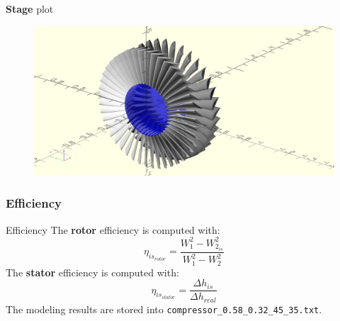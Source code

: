 	\begin{frame}{\textbf{Stage} plot}
		\begin{figure}
			\centering
			\includegraphics[width=1\textwidth]{figures/compressor.png}
		\end{figure}
	\end{frame}

\subsubsection{Efficiency}
	\begin{frame}[fragile]{Efficiency}
		The \textbf{rotor} efficiency is computed with:
		\begin{equation}
			\eta_{is_{rotor}} = \frac{W_1^2 - W_{2_{is}}^2}{W_1^2 - W_{2}^2} \nonumber 
		\end{equation}
		The \textbf{stator} efficiency is computed with:
		\begin{equation}
			\eta_{is_{stator}} = \frac{\Delta h_{is}}{\Delta h_{real}}
			\nonumber 
		\end{equation}
		The modeling results are stored into \verb|compressor_0.58_0.32_45_35.txt|.
	\end{frame}
